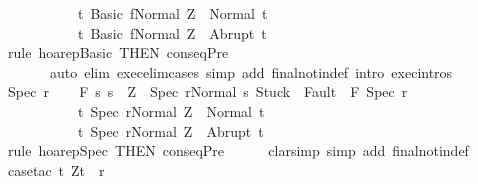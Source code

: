 \begin{isabellebody}
\ \ \ \ \ \ \ \ \ \ \ {\isacharbraceleft}t{\isachardot}\ {\isasymGamma}{\isasymturnstile}{\isasymlangle}Basic\ f{\isacharcomma}Normal\ Z{\isasymrangle}\ {\isasymRightarrow}\ Normal\ t{\isacharbraceright}{\isacharcomma}\ \isanewline
\ \ \ \ \ \ \ \ \ \ \ {\isacharbraceleft}t{\isachardot}\ {\isasymGamma}{\isasymturnstile}{\isasymlangle}Basic\ f{\isacharcomma}Normal\ Z{\isasymrangle}\ {\isasymRightarrow}\ Abrupt\ t{\isacharbraceright}{\isachardoublequoteclose}\isanewline
\ \ \ \ \isamarkupfalse%
\ {\isacharparenleft}rule\ hoarep{\isachardot}Basic\ {\isacharbrackleft}THEN\ conseqPre{\isacharbrackright}{\isacharparenright}\isanewline
\ \ \ \ \ \ \ {\isacharparenleft}auto\ elim{\isacharcolon}\ exec{\isacharunderscore}elim{\isacharunderscore}cases\ simp\ add{\isacharcolon}\ final{\isacharunderscore}notin{\isacharunderscore}def\ intro{\isacharcolon}\ exec{\isachardot}intros{\isacharparenright}\isanewline
{}\isamarkupfalse%
\isanewline
\ \ \isamarkupfalse%
\ {\isacharparenleft}Spec\ r{\isacharparenright}\isanewline
\ \ \isamarkupfalse%
\ {\isachardoublequoteopen}{\isasymGamma}{\isacharcomma}{\isasymTheta}{\isasymturnstile}\isactrlbsub {\isacharslash}F\isactrlesub \ {\isacharbraceleft}s{\isachardot}\ s\ {\isacharequal}\ Z\ {\isasymand}\ {\isasymGamma}{\isasymturnstile}{\isasymlangle}Spec\ r{\isacharcomma}Normal\ s{\isasymrangle}\ {\isasymRightarrow}{\isasymnotin}{\isacharparenleft}{\isacharbraceleft}Stuck{\isacharbraceright}\ {\isasymunion}\ Fault\ {\isacharbackquote}\ {\isacharparenleft}{\isacharminus}F{\isacharparenright}{\isacharparenright}{\isacharbraceright}\ Spec\ r\isanewline
\ \ \ \ \ \ \ \ \ \ \ {\isacharbraceleft}t{\isachardot}\ {\isasymGamma}{\isasymturnstile}{\isasymlangle}Spec\ r{\isacharcomma}Normal\ Z{\isasymrangle}\ {\isasymRightarrow}\ Normal\ t{\isacharbraceright}{\isacharcomma}\ \isanewline
\ \ \ \ \ \ \ \ \ \ \ {\isacharbraceleft}t{\isachardot}\ {\isasymGamma}{\isasymturnstile}{\isasymlangle}Spec\ r{\isacharcomma}Normal\ Z{\isasymrangle}\ {\isasymRightarrow}\ Abrupt\ t{\isacharbraceright}{\isachardoublequoteclose}\isanewline
\ \ \ \ \isamarkupfalse%
\ {\isacharparenleft}rule\ hoarep{\isachardot}Spec\ {\isacharbrackleft}THEN\ conseqPre{\isacharbrackright}{\isacharparenright}\isanewline
\ \ \ \ \isamarkupfalse%
\ {\isacharparenleft}clarsimp\ simp\ add{\isacharcolon}\ final{\isacharunderscore}notin{\isacharunderscore}def{\isacharparenright}\isanewline
\ \ \ \ \isamarkupfalse%
\ {\isacharparenleft}case{\isacharunderscore}tac\ {\isachardoublequoteopen}{\isasymexists}t{\isachardot}\ {\isacharparenleft}Z{\isacharcomma}t{\isacharparenright}\ {\isasymin}\ r{\isachardoublequoteclose}{\isacharparenright}\isanewline

\end{isabellebody}

